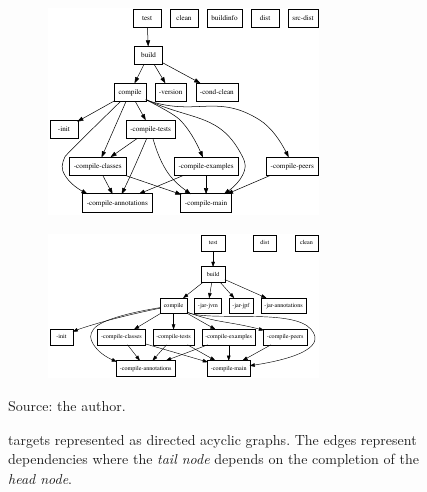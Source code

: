 \documentclass{article}
\begin{document}
\begin{figure}[h!]
    \centering
    \begin{subfigure}[b]{0.49\textwidth}
        \centering
        \includegraphics[width=.9\textwidth]{figs/jpf-tasks.pdf}%
        \caption{\jpfcore{}}
    \end{subfigure}
    \hfill
    \begin{subfigure}[b]{0.49\textwidth}
        \centering
        \includegraphics[width=\textwidth]{figs/symbc-tasks.pdf}%
        \caption{\jpfsymbc{}}
    \end{subfigure}
    \caption{\ant{} targets represented as directed acyclic graphs. The edges
    represent dependencies where the \emph{tail node} depends on the completion
    of the \emph{head node}.\label{fig:tasks}}
    {\scriptsize Source: the author.}
\end{figure}
\end{document}
